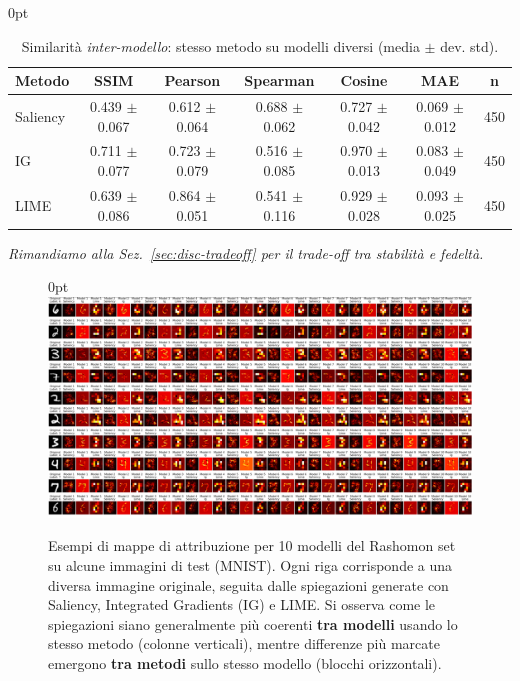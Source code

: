 \documentclass[12pt,a4paper,oneside]{report}
\numberwithin{figure}{chapter}
\numberwithin{table}{chapter}
\newenvironment{tabindent}[1][\parindent]{%
  \begin{table}[H]\begin{adjustwidth}{#1}{0pt}\centering}{%
  \end{adjustwidth}\end{table}}
\newenvironment{figindent}[1][\parindent]{%
  \begin{figure}[H]\begin{adjustwidth}{#1}{0pt}\centering}{%
  \end{adjustwidth}\end{figure}}
\begin{document}
\begin{tabindent}
      \renewcommand{\arraystretch}{1.1}
      \begin{tabular}{lccccc c}
            \hline
            \textbf{Metodo} & \textbf{SSIM}     & \textbf{Pearson}  & \textbf{Spearman} & \textbf{Cosine}   & \textbf{MAE}      & \textbf{n} \\
            \hline
            Saliency        & 0.439 $\pm$ 0.067 & 0.612 $\pm$ 0.064 & 0.688 $\pm$ 0.062 & 0.727 $\pm$ 0.042 & 0.069 $\pm$ 0.012 & 450        \\
            IG              & 0.711 $\pm$ 0.077 & 0.723 $\pm$ 0.079 & 0.516 $\pm$ 0.085 & 0.970 $\pm$ 0.013 & 0.083 $\pm$ 0.049 & 450        \\
            LIME            & 0.639 $\pm$ 0.086 & 0.864 $\pm$ 0.051 & 0.541 $\pm$ 0.116 & 0.929 $\pm$ 0.028 & 0.093 $\pm$ 0.025 & 450        \\
            \hline
      \end{tabular}
      \caption{Similarità \emph{inter-modello}: stesso metodo su modelli diversi (media $\pm$ dev. std).}
      \label{tab:sim_inter}
\end{tabindent}

{\small \textit{Rimandiamo alla Sez.~\ref{sec:disc-tradeoff} per il trade-off tra stabilità e fedeltà.}}


\begin{figindent}
      \centering
      \includegraphics[width=\textwidth]{images/visualizzazione (2).png}
      \caption{Esempi di mappe di attribuzione per 10 modelli del Rashomon set su alcune immagini di test (MNIST).
            Ogni riga corrisponde a una diversa immagine originale, seguita dalle spiegazioni generate con Saliency, Integrated Gradients (IG) e LIME.
            Si osserva come le spiegazioni siano generalmente più coerenti \textbf{tra modelli} usando lo stesso metodo (colonne verticali),
            mentre differenze più marcate emergono \textbf{tra metodi} sullo stesso modello (blocchi orizzontali).}
      \label{fig:similarity_examples}
\end{figindent}
\end{document}
